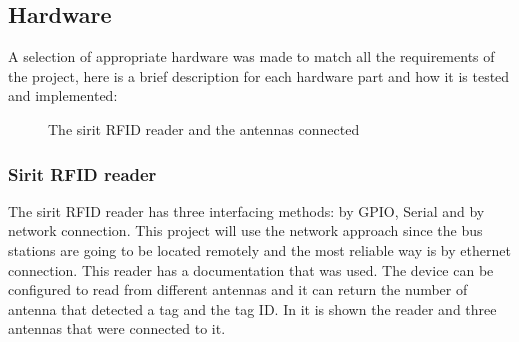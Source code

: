 \documentclass[a4paper,twoside]{IEEEtran}
\begin{document}
\subsection{Hardware}
A selection of appropriate hardware was made to match all the requirements of the project, here is a brief description for each hardware part and how it is tested and implemented:
\begin{figure}[h]
\centering
{}
\caption{The sirit RFID reader and the antennas connected}
\label{sirireader}
\end{figure}
\subsubsection{Sirit RFID reader}
The sirit RFID reader has three interfacing methods: by GPIO, Serial and by network connection. This project will use the network approach since the bus stations are going to be located remotely and the most reliable way is by ethernet connection. This reader has a documentation \cite{1} that was used. The device can be configured to read from different antennas and it can return the number of antenna that detected a tag and the tag ID. In  it is shown the reader and three antennas that were connected to it. 
\end{document}
